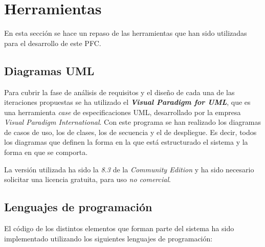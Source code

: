 \section{Herramientas}
En esta sección se hace un repaso de las herramientas que han sido utilizadas
para el desarrollo de este \acs{PFC}.

  \subsection{Diagramas \acs{UML}}
  Para cubrir la fase de análisis de requisitos y el diseño de cada una de las
  iteraciones propuestas se ha utilizado el \emph{\textbf{Visual Paradigm
  for \acs{UML}}}, que es una herramienta \emph{case} de especificaciones
  \acs{UML}, desarrollado por la empresa \emph{Visual Paradigm International}.
  Con este programa se han realizado los diagramas de casos de uso, los de
  clases, los de secuencia y el de despliegue. Es decir,
  todos los diagramas que definen la forma en la que está estructurado el
  sistema y la forma en que se comporta.

  La versión utilizada ha sido la \emph{8.3} de la \emph{Community Edition} y
  ha sido necesario solicitar una licencia gratuita, para uso \emph{no 
  comercial}.

  \subsection{Lenguajes de programación}
  El código de los distintos elementos que forman parte del sistema ha sido
  implementado utilizando los siguientes lenguajes de programación:

